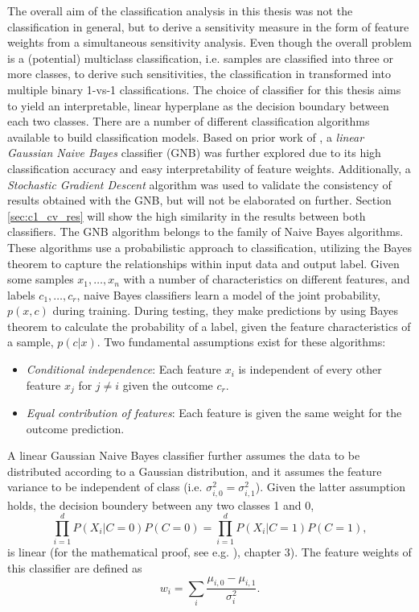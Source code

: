 \documentclass[a4paper, 12pt]{scrreprt}
\begin{document}
The overall aim of the classification analysis in this thesis was not the classification in general, but to derive a sensitivity measure in the form of feature weights from a simultaneous sensitivity analysis. Even though the overall problem is a (potential) multiclass classification, i.e. samples are classified into three or more classes, to derive such sensitivities, the classification in transformed into multiple binary 1-vs-1 classifications. The choice of classifier for this thesis aims to yield an interpretable, linear hyperplane as the decision boundary between each two classes. \newline
There are a number of different classification algorithms available to build classification models. Based on prior work of \textcite{nastase2016}, a \textit{linear Gaussian Naive Bayes} classifier (GNB) was further explored due to its high classification accuracy and easy interpretability of feature weights. Additionally, a \textit{Stochastic Gradient Descent} algorithm was used to validate the consistency of results obtained with the GNB, but will not be elaborated on further. Section \ref{sec:c1_cv_res} will show the high similarity in the results between both classifiers. \newline
The GNB algorithm belongs to the family of Naive Bayes algorithms. These algorithms use a probabilistic approach to classification, utilizing the Bayes theorem to capture the relationships within input data and output label. Given some samples $x_1, \ldots, x_n$ with a number of characteristics on different features, and labels $c_1, \ldots, c_r$, naive Bayes classifiers learn a model of the joint probability, $p(x, c)$ during training. During testing, they make predictions by using Bayes theorem to calculate the probability of a label, given the feature characteristics of a sample, $p(c|x)$. Two fundamental assumptions exist for these algorithms: \newline 
\begin{itemize}
	\item \textit{Conditional independence}: Each feature $x_i$ is independent of every other feature $x_j$ for $j \neq i$ given the outcome $c_r$.
	\item \textit{Equal contribution of features}:  Each feature is given the same weight for the outcome prediction. 
\end{itemize} 
A linear Gaussian Naive Bayes classifier further assumes the data to be distributed according to a Gaussian distribution, and it assumes the feature variance to be independent of class (i.e. $\sigma_{i, 0}^2 = \sigma_{i, 1}^2$). Given the latter assumption holds, the decision boundery between any two classes 1 and 0,
\begin{equation}
\prod_{i=1}^{d} P(X_i |C = 0)P(C=0) = \prod_{i=1}^{d} P(X_i |C = 1)P(C=1),
\end{equation}
is linear (for the mathematical proof, see e.g. \textcite{DBLP:books/daglib/0087929}), chapter 3). The feature weights of this classifier are defined as
\begin{equation}
w_i = \sum_{i}\frac{\mu_{i, 0}-\mu_{i, 1}}{\sigma_{i}^{2}}.
\end{equation}
\end{document}

